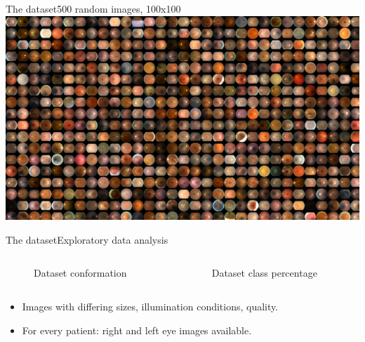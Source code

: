 \documentclass{beamer}
\begin{document}
\begin{frame}{The dataset}{500 random images, 100x100}
	\includegraphics[width=1.0\textwidth]{mosaic-500-100x100.png}	
\end{frame}


\begin{frame}{The dataset}{Exploratory data analysis}
	\begin{columns}
		\begin{column}{0.5\textwidth}
			\begin{figure}[p]
				\caption{Dataset conformation}
			\end{figure}	
		\end{column}
		\begin{column}{0.4\textwidth}  %
			\begin{figure}[p]
				\caption{Dataset class percentage}
			\end{figure}
		\end{column}
	\end{columns}	
	\begin{itemize}
		\item Images with differing sizes, illumination conditions, quality.\\ 
		\item For every patient: right and left eye images available.
	\end{itemize}
\end{frame}
\end{document}
